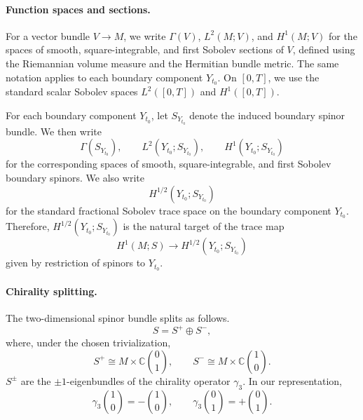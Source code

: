 \documentclass[11pt]{article}
\theoremstyle{definition}
\numberwithin{equation}{section}
\begin{document}
\paragraph{Function spaces and sections.}
For a vector bundle \(V\to M\), we write \(\Gamma(V)\), \(L^2(M;V)\), and \(H^1(M;V)\) for the spaces of smooth, square-integrable, and first Sobolev sections of \(V\), defined using the Riemannian volume measure and the Hermitian bundle metric. The same notation applies to each boundary component \(Y_{t_0}\). On \([0,T]\), we use the standard scalar Sobolev spaces \(L^2([0,T])\) and \(H^1([0,T])\).

For each boundary component \(Y_{t_0}\), let \(S_{Y_{t_0}}\) denote the induced boundary spinor bundle. We then write
\begin{equation}
\Gamma(S_{Y_{t_0}}),\qquad
L^2(Y_{t_0};S_{Y_{t_0}}),\qquad
H^1(Y_{t_0};S_{Y_{t_0}})
\end{equation}
for the corresponding spaces of smooth, square-integrable, and first Sobolev boundary spinors. We also write
\begin{equation}
H^{1/2}(Y_{t_0};S_{Y_{t_0}})
\end{equation}
for the standard fractional Sobolev trace space on the boundary component \(Y_{t_0}\). Therefore, \(H^{1/2}(Y_{t_0};S_{Y_{t_0}})\) is the natural target of the trace map
\begin{equation}
H^1(M;S)\longrightarrow H^{1/2}(Y_{t_0};S_{Y_{t_0}})
\end{equation}
given by restriction of spinors to \(Y_{t_0}\).







\paragraph{Chirality splitting.}
The two-dimensional spinor bundle splits as follows.
\begin{equation}
S=S^+\oplus S^-,
\end{equation}
where, under the chosen trivialization,
\begin{equation}
S^+ \cong M\times \mathbb C\binom{0}{1},\qquad
S^- \cong M\times \mathbb C\binom{1}{0}.
\label{eq:chiral_split}
\end{equation}
%
$S^\pm$ are the $\pm1$-eigenbundles of the chirality operator $\gamma_3$. In our representation,
\begin{equation}
\gamma_3\binom{1}{0}=-\binom{1}{0},\qquad
\gamma_3\binom{0}{1}=+\binom{0}{1}.
\end{equation}
\end{document}
